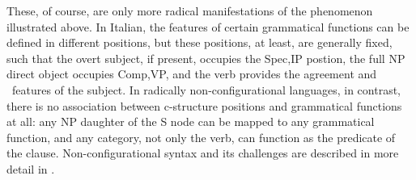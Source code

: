 \documentclass[output=paper,hidelinks]{langscibook}
\begin{document}
  \begin{exe}
  \ex\label{ex:warlpiri}
 \end{exe}
  
 These, of course, are only more radical manifestations of the phenomenon illustrated above. In Italian, the features of certain grammatical functions can be defined in different positions, but these positions, at least, are generally fixed, such that the overt subject, if present, occupies the Spec,IP postion, the full NP direct object occupies Comp,VP, and the verb provides the agreement and \PRED\ features of the subject. In radically non-configurational languages, in contrast, there is no association between c-structure positions and grammatical functions at all: any NP daughter of the S node can be mapped to any grammatical function, and any category, not only the verb, can function as the predicate of the clause. Non-configurational syntax and its challenges are described in more detail in .
 
\end{document}
